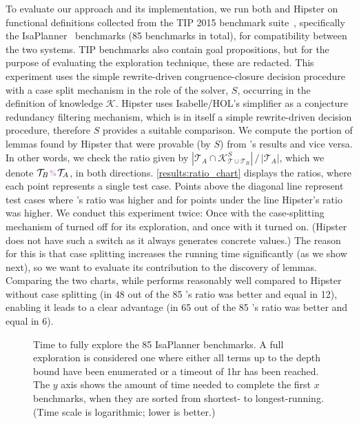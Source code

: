 To evaluate our approach and its implementation, we run both \TheSy and Hipster
on functional definitions collected from the TIP 2015 benchmark suite~\cite{CICM2015:Claessen}, specifically the IsaPlanner~\cite{ITP2010:Johansson} benchmarks (85 benchmarks in total), for compatibility between the two systems.
TIP benchmarks also contain goal propositions, but for the purpose of evaluating the exploration technique, these are redacted.
This experiment uses the simple rewrite-driven congruence-closure decision procedure with a case split mechanism in the role of the solver, $S$, occurring in the definition of knowledge $\mathcal{K}$.
Hipster uses Isabelle/HOL's simplifier as a conjecture redundancy filtering mechanism, which is in itself a simple rewrite-driven decision procedure, therefore $S$ provides a suitable comparison.
We compute the portion of lemmas found by Hipster that were provable (by $S$) from \TheSy's results and vice versa.
In other words, we check the ratio given by $| \mathcal{T}_A \cap \mathcal{K}_{\mathcal{T}\cup\mathcal{T}_B}^S | \,/\, | \mathcal{T}_A |$, which we denote $\mathcal{T}_B\cmptheories\mathcal{T}_A$, in both directions.
\autoref{results:ratio_chart} displays the ratios, where each point represents a single test case.
Points above the diagonal line represent test cases where \TheSy's ratio was higher and for points under the line Hipster's ratio was higher.
We conduct this experiment twice: Once with the case-splitting mechanism of \TheSy turned off for its exploration, and once with it turned on. (Hipster does not have such a switch as it always generates concrete values.)
The reason for this is that case splitting increases the running time significantly (as we show next), so we want to evaluate its contribution to the discovery of lemmas.
Comparing the two charts, while \TheSy performs reasonably well compared to Hipster without case splitting (in 48 out of the 85 \TheSy's ratio was better and equal in 12), enabling it leads to a clear advantage (in 65 out of the 85 \TheSy's ratio was better and equal in 6).


\begin{figure}[t]
\centering
%

\vspace{-2em}
\caption{Time to fully explore the 85 IsaPlanner benchmarks.
A full exploration is considered one where either all terms up to the depth bound have been enumerated or a timeout of 1hr has been reached.
The $y$ axis shows the amount of time needed to complete the first $x$ benchmarks, when they are sorted from shortest- to longest-running.
(Time scale is logarithmic; lower is better.)}
\label{results:time-perc-table}
\end{figure}


